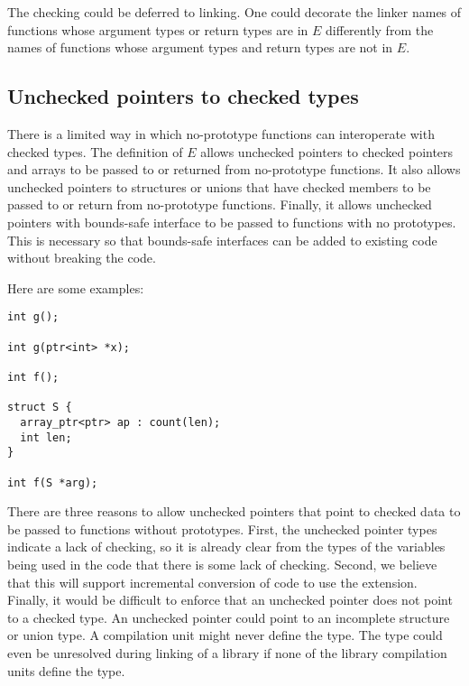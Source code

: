 The checking could be deferred to linking.  One could decorate the linker names of 
functions whose argument types or return types are in $E$ differently from the names 
of functions whose argument types and return types are not in $E$.

\subsection{Unchecked pointers to checked types}
There is a limited way in which no-prototype functions can interoperate with checked types.
The definition of $E$ allows unchecked
pointers to checked pointers and arrays
to be passed to or returned from no-prototype functions.  It also allows unchecked pointers to
structures or unions that have checked members to be passed to or return from
no-prototype functions.  Finally, it allows unchecked pointers with bounds-safe interface to be 
passed to functions with no prototypes.  This is necessary so that bounds-safe interfaces
can be added to existing code without breaking the code.   

Here are some examples:
\begin{verbatim}
int g();

int g(ptr<int> *x);

int f();

struct S {
  array_ptr<ptr> ap : count(len);
  int len;
}

int f(S *arg);
\end{verbatim}

There are three reasons to allow unchecked pointers that point to checked data to
be passed to functions without prototypes.  First, the unchecked pointer types 
indicate a lack of checking, so it is already clear from the types of the variables being
used in the code that there is some lack of checking.  Second, we believe that this
will support incremental conversion of code to use the extension.  Finally,
it would be difficult to enforce that an unchecked pointer does not point
to a checked type. An unchecked pointer could point to an incomplete
structure or union type. A compilation unit might never define the type. The type
could even be unresolved during linking of a library if none of the library compilation units
define the type.
